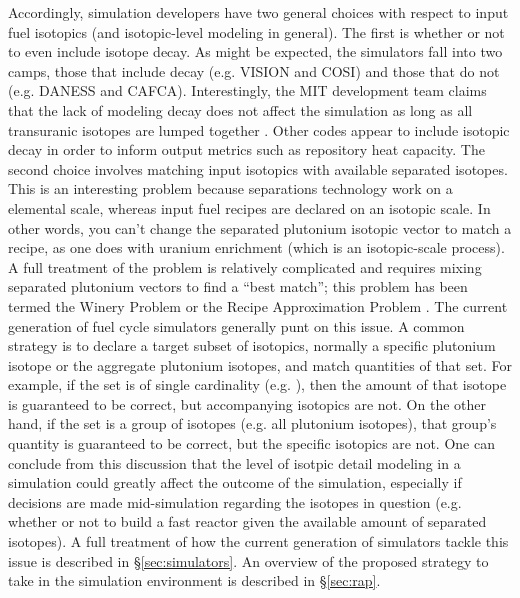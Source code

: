 Accordingly, simulation developers have two general choices with respect to
input fuel isotopics (and isotopic-level modeling in general). The first is
whether or not to even include isotope decay. As might be expected, the
simulators fall into two camps, those that include decay (e.g. VISION and COSI)
and those that do not (e.g. DANESS and CAFCA). Interestingly, the MIT
development team claims that the lack of modeling decay does not affect the
simulation as long as all transuranic isotopes are lumped together
\cite{guerin_impact_2009}. Other codes appear to include isotopic decay in order
to inform output metrics such as repository heat capacity. The second choice
involves matching input isotopics with available separated isotopes. This is an
interesting problem because separations technology work on a elemental scale,
whereas input fuel recipes are declared on an isotopic scale. In other words,
you can't change the separated plutonium isotopic vector to match a recipe, as
one does with uranium enrichment (which is an isotopic-scale process). A full
treatment of the problem is relatively complicated and requires mixing separated
plutonium vectors to find a ``best match''; this problem has been termed the
Winery Problem or the Recipe Approximation Problem
\cite{oliver_geniusv2:_2009}. The current generation of fuel cycle simulators
generally punt on this issue. A common strategy is to declare a target subset of
isotopics, normally a specific plutonium isotope or the aggregate plutonium
isotopes, and match quantities of that set. For example, if the set is of single
cardinality (e.g. ), then the amount of that isotope is guaranteed
to be correct, but accompanying isotopics are not. On the other hand, if the set
is a group of isotopes (e.g. all plutonium isotopes), that group's quantity is
guaranteed to be correct, but the specific isotopics are not. One can conclude
from this discussion that the level of isotpic detail modeling in a simulation
could greatly affect the outcome of the simulation, especially if decisions are
made mid-simulation regarding the isotopes in question (e.g. whether or not to
build a fast reactor given the available amount of separated isotopes). A full
treatment of how the current generation of simulators tackle this issue is
described in \S\ref{sec:simulators}. An overview of the proposed strategy to
take in the \Cyclus simulation environment is described in \S\ref{sec:rap}.

